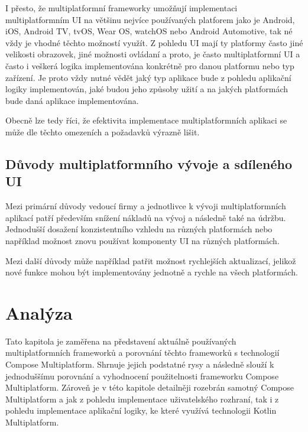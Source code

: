 I přesto, že multiplatformní frameworky umožňují implementaci multiplatformním UI na většinu nejvíce používaných platforem jako je Android, iOS,
Android TV, tvOS, Wear OS, watchOS nebo Android Automotive, tak né vždy je vhodné těchto možností využít. Z pohledu UI mají ty platformy často jiné 
velikosti obrazovek, jiné možnosti ovládaní a proto, je často multiplatformní UI a často i veškerá logika implementována konkrétně pro danou platformu
nebo typ zařízení. Je proto vždy nutné vědět jaký typ aplikace bude z pohledu aplikační logiky implementován, jaké budou jeho způsoby užití a na jakých 
platformách bude daná aplikace implementována.

Obecně lze tedy říci, že efektivita implementace multiplatformních aplikaci se může dle těchto omezeních a požadavků výrazně lišit.


\section{Důvody multiplatformního vývoje a sdíleného UI}

Mezi primární důvody vedoucí firmy a jednotlivce k vývoji multiplatformních aplikací patří především
snížení nákladů na vývoj a následně také na údržbu. Jednodušší dosažení konzistentního vzhledu
na různých platformách nebo například možnost znovu používat komponenty UI na různých platformách.

Mezi další důvody může například patřit možnost rychlejších aktualizací, jelikož nové funkce mohou být 
implementovány jednotně a rychle na všech platformách. 

\chapter{Analýza}
Tato kapitola je zaměřena na představení aktuálně používaných multiplatformních frameworků a porovnání těchto frameworků
s technologií Compose Multiplatform. Shrnuje jejich podstatné rysy a následně slouží k
jednoduššímu porovnání a vyhodnocení použitelnosti frameworku Compose Multiplatform. Zároveň je v této kapitole detailněji
rozebrán samotný Compose Multiplatform a jak z pohledu implementace uživatelského rozhraní, tak i z pohledu implementace
aplikační logiky, ke které využívá technologii Kotlin Multiplatform.

